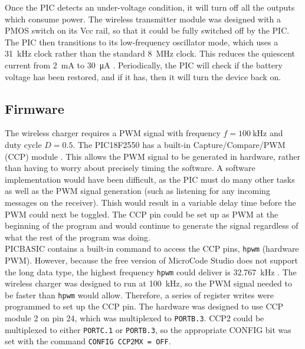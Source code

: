 Once the PIC detects an under-voltage condition, it will turn off all the outputs which consume power. The wireless transmitter module was designed with a PMOS switch on its Vcc rail, so that it could be fully switched off by the PIC. The PIC then transitions to its low-frequency oscillator mode, which uses a \SI{31}{\kilo\hertz} clock rather than the standard \SI{8}{\mega\hertz} clock. This reduces the quiescent current from \SI{2}{\milli\ampere} to \SI{30}{\micro\ampere} \cite{pic16f688}. Periodically, the PIC will check if the battery voltage has been restored, and if it has, then it will turn the device back on.
 



\subsection{Firmware}
The wireless charger requires a PWM signal with frequency $f=\SI{100}{\kilo\hertz}$ and duty cycle $D=0.5$. The PIC18F2550 has a built-in Capture/Compare/PWM (CCP) module \cite{pic18f2550}. This allows the PWM signal to be generated in hardware, rather than having to worry about precisely timing the software. A software implementation would have been difficult, as the PIC must do many other tasks as well as the PWM signal generation (such as listening for any incoming messages on the receiver). Thish would result in a variable delay time before the PWM could next be toggled. The CCP pin could be set up as PWM at the beginning of the program and would continue to generate the signal regardless of what the rest of the program was doing.\\

PICBASIC contains a built-in command to access the CCP pins, \verb|hpwm| (hardware PWM). However, because the free version of MicroCode Studio does not support the long data type, the highest frequency \verb|hpwm| could deliver is \SI{32.767}{\kilo\hertz} \cite{picbasic_pro}. The wireless charger was designed to run at \SI{100}{\kilo\hertz}, so the PWM signal needed to be faster than \verb|hpwm| would allow. Therefore, a series of register writes were programmed to set up the CCP pin. The hardware was designed to use CCP module 2 on pin 24, which was multiplexed to \verb|PORTB.3|. CCP2 could be multiplexed to either \verb|PORTC.1| or \verb|PORTB.3|, so the appropriate CONFIG bit was set with the command \verb|CONFIG CCP2MX = OFF|.\\

